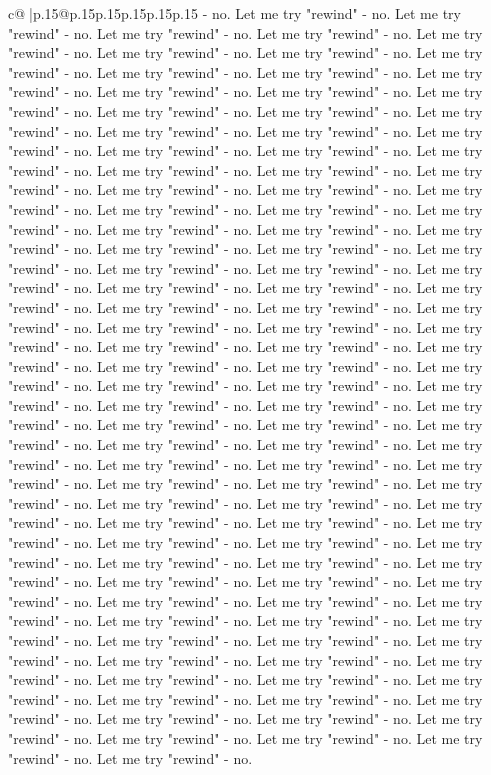 \documentclass{article}
\begin{document}
{\begin{supertabular}{c@{$\;$}|p{.15\linewidth}@{}p{.15\linewidth}p{.15\linewidth}p{.15\linewidth}p{.15\linewidth}p{.15\linewidth}}
{{{{-} no. Let me try "rewind" {-} no. Let me try "rewind" {-} no. Let me try "rewind" {-} no. Let me try "rewind" {-} no. Let me try "rewind" {-} no. Let me try "rewind" {-} no. Let me try "rewind" {-} no. Let me try "rewind" {-} no. Let me try "rewind" {-} no. Let me try "rewind" {-} no. Let me try "rewind" {-} no. Let me try "rewind" {-} no. Let me try "rewind" {-} no. Let me try "rewind" {-} no. Let me try "rewind" {-} no. Let me try "rewind" {-} no. Let me try "rewind" {-} no. Let me try "rewind" {-} no. Let me try "rewind" {-} no. Let me try "rewind" {-} no. Let me try "rewind" {-} no. Let me try "rewind" {-} no. Let me try "rewind" {-} no. Let me try "rewind" {-} no. Let me try "rewind" {-} no. Let me try "rewind" {-} no. Let me try "rewind" {-} no. Let me try "rewind" {-} no. Let me try "rewind" {-} no. Let me try "rewind" {-} no. Let me try "rewind" {-} no. Let me try "rewind" {-} no. Let me try "rewind" {-} no. Let me try "rewind" {-} no. Let me try "rewind" {-} no. Let me try "rewind" {-} no. Let me try "rewind" {-} no. Let me try "rewind" {-} no. Let me try "rewind" {-} no. Let me try "rewind" {-} no. Let me try "rewind" {-} no. Let me try "rewind" {-} no. Let me try "rewind" {-} no. Let me try "rewind" {-} no. Let me try "rewind" {-} no. Let me try "rewind" {-} no. Let me try "rewind" {-} no. Let me try "rewind" {-} no. Let me try "rewind" {-} no. Let me try "rewind" {-} no. Let me try "rewind" {-} no. Let me try "rewind" {-} no. Let me try "rewind" {-} no. Let me try "rewind" {-} no. Let me try "rewind" {-} no. Let me try "rewind" {-} no. Let me try "rewind" {-} no. Let me try "rewind" {-} no. Let me try "rewind" {-} no. Let me try "rewind" {-} no. Let me try "rewind" {-} no. Let me try "rewind" {-} no. Let me try "rewind" {-} no. Let me try "rewind" {-} no. Let me try "rewind" {-} no. Let me try "rewind" {-} no. Let me try "rewind" {-} no. Let me try "rewind" {-} no. Let me try "rewind" {-} no. Let me try "rewind" {-} no. Let me try "rewind" {-} no. Let me try "rewind" {-} no. Let me try "rewind" {-} no. Let me try "rewind" {-} no. Let me try "rewind" {-} no. Let me try "rewind" {-} no. Let me try "rewind" {-} no. Let me try "rewind" {-} no. Let me try "rewind" {-} no. Let me try "rewind" {-} no. Let me try "rewind" {-} no. Let me try "rewind" {-} no. Let me try "rewind" {-} no. Let me try "rewind" {-} no. Let me try "rewind" {-} no. Let me try "rewind" {-} no. Let me try "rewind" {-} no. Let me try "rewind" {-} no. Let me try "rewind" {-} no. Let me try "rewind" {-} no. Let me try "rewind" {-} no. Let me try "rewind" {-} no. Let me try "rewind" {-} no. Let me try "rewind" {-} no. Let me try "rewind" {-} no. Let me try "rewind" {-} no. Let me try "rewind" {-} no. Let me try "rewind" {-} no. Let me try "rewind" {-} no. Let me try "rewind" {-} no. Let me try "rewind" {-} no. Let me try "rewind" {-} no. Let me try "rewind" {-} no. Let me try "rewind" {-} no. Let me try "rewind" {-} no. Let me try "rewind" {-} no. Let me try "rewind" {-} no. Let me try "rewind" {-} no. Let me try "rewind" {-} no. Let me try "rewind" {-} no. Let me try "rewind" {-} no. Let me try "rewind" {-} no. Let me try "rewind" {-} no. Let me try "rewind" {-} no. }}}
\end{supertabular}}
\end{document}
